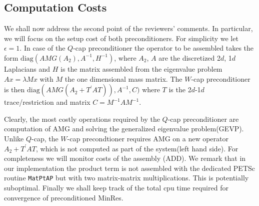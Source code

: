 \documentclass[10pt, a4paper]{article}
\newcommand{\dual}[1]{\ensuremath{{#1}^{\prime}}}
\begin{document}
\subsection*{Computation Costs} We shall now address the second point of the 
reviewers' comments. In particular, we will focus on the setup cost of both 
preconditioners. For simplicity we let $\epsilon=1$. In case of the $Q$-cap 
preconditioner the operator to be assembled takes the form $\text{diag}(AMG(A_2), A^{-1}, H^{-1})$, 
where $A_2$, $A$ are the discretized 2$d$, 1$d$ Laplacians and $H$ is the matrix assembled 
from the eigenvalue problem $Ax=\lambda M x$ with $M$ the one dimensional mass matrix. 
The $W$-cap preconditioner is then $\text{diag}(AMG(A_2+\dual{T}AT)), A^{-1}, C)$ 
where $T$ is the 2$d$-1$d$ trace/restriction and matrix $C=M^{-1}AM^{-1}$. 

Clearly, the most costly operations required by the $Q$-cap preconditioner are
computation of AMG and solving the generalized eigenvalue problem(GEVP). Unlike
$Q$-cap, the $W$-cap precondtioner requires AMG on a new operator
$A_2+\dual{T}AT$, which is not computed as part of the system(left hand side). 
For completeness we will monitor costs of the assembly (ADD). We remark that in our
implementation the product term is not assembled with the dedicated PETSc
routine \texttt{MatPtAP} but with two matrix-matrix multiplications. This is
potentially suboptimal. Finally we shall keep track of the total cpu time
required for convergence of preconditioned MinRes.
\end{document}

